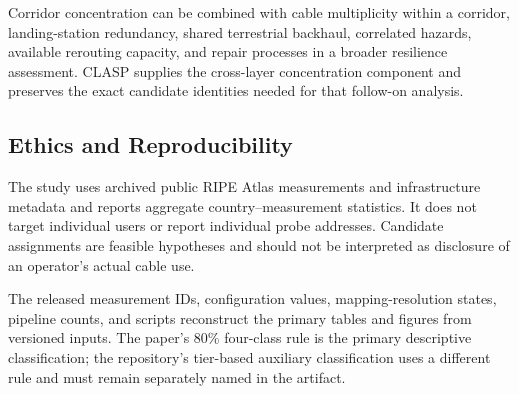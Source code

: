 Corridor concentration can be combined with cable multiplicity within a
corridor, landing-station redundancy, shared terrestrial backhaul, correlated
hazards, available rerouting capacity, and repair processes in a broader
resilience assessment. CLASP supplies the cross-layer concentration component
and preserves the exact candidate identities needed for that follow-on
analysis.

\subsection{Ethics and Reproducibility}
\label{subsec:ethics-reproducibility}

The study uses archived public RIPE Atlas measurements and infrastructure
metadata and reports aggregate country--measurement statistics. It does not
target individual users or report individual probe addresses. Candidate
assignments are feasible hypotheses and should not be interpreted as
disclosure of an operator's actual cable use.

The released measurement IDs, configuration values, mapping-resolution
states, pipeline counts, and scripts reconstruct the primary tables and
figures from versioned inputs. The paper's 80\% four-class rule is the primary
descriptive classification; the repository's tier-based auxiliary
classification uses a different rule and must remain separately named in the
artifact.
